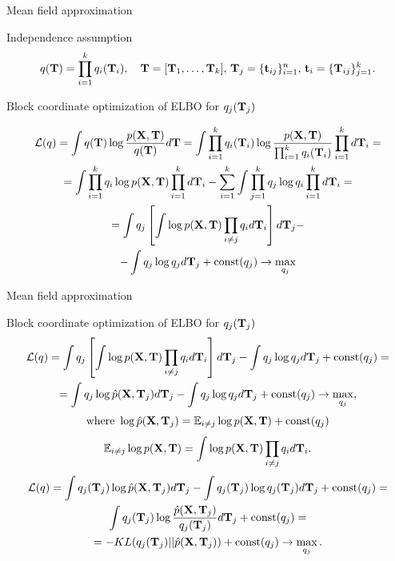 \begin{frame}{Mean field approximation}
    \begin{block}{Independence assumption}
    \vspace{-0.3cm}
    \[
    q(\mathbf{T}) = \prod_{i=1}^k q_i(\mathbf{T}_i), \quad \mathbf{T} = [\mathbf{T}_1, \dots, \mathbf{T}_k], \, \mathbf{T}_j = \{ \mathbf{t}_{ij}\}_{i=1}^n, \, \mathbf{t}_i = \{ \mathbf{T}_{ij}\}_{j=1}^k.
    \]
    \vspace{-0.3cm}
    \end{block}
    \begin{block}{Block coordinate optimization of ELBO for $q_j(\mathbf{T}_j)$}
  
    {\footnotesize
    \vspace{-0.3cm}
        \begin{multline*}
    		\mathcal{L} (q)
    		= \int q(\mathbf{T}) \log \frac{p(\mathbf{X}, \mathbf{T})}{q(\mathbf{T})}d\mathbf{T}
    		= \int \prod_{i=1}^k q_i(\mathbf{T}_i) \log \frac{p(\mathbf{X}, \mathbf{T})}{\prod_{i=1}^k q_i(\mathbf{T}_i)}  \prod_{i=1}^k d \mathbf{T}_i = \\
    		= \int \prod_{i=1}^k q_i \log p(\mathbf{X}, \mathbf{T}) \prod_{i=1}^k d \mathbf{T}_i  
    		- \sum_{i=1}^k \int \prod_{j=1}^k q_j \log q_i \prod_{i=1}^k d \mathbf{T}_i = \\
    		= \int q_j \left[\int  \log p(\mathbf{X}, \mathbf{T}) \prod_{i \neq j} q_i d \mathbf{T}_i \right] d \mathbf{T}_j - \\
    		- \int q_j \log q_j d\mathbf{T}_j + \text{const}(q_j) \rightarrow \max_{q_j}
    	\end{multline*}
        \vspace{-0.3cm}}
    \end{block}
\end{frame}
\begin{frame}{Mean field approximation}
	\footnotesize
	\begin{block}{Block coordinate optimization of ELBO for $q_j(\mathbf{T}_j)$}
		\vspace{-0.4cm}
	    \begin{multline*}
			\mathcal{L} (q) 
			= \int q_j \left[\int \log p(\mathbf{X}, \mathbf{T}) \prod_{i \neq j} q_i d \mathbf{T}_i \right] d \mathbf{T}_j
			- \int q_j \log q_j  d\mathbf{T}_j + \text{const}(q_j) = \\
			= \int q_j \log \hat{p}(\mathbf{X}, \mathbf{T}_j) d \mathbf{T}_j 
			- \int q_j \log q_j d\mathbf{T}_j + \text{const}(q_j) \rightarrow \max_{q_j},
		\end{multline*}
		\[
		    \text{where } \log \hat{p}(\mathbf{X}, \mathbf{T}_j) = \mathbb{E}_{i \neq j} \log p(\mathbf{X}, \mathbf{T}) + \text{const}(q_j)
		\]
		\[
		    \mathbb{E}_{i \neq j} \log p(\mathbf{X}, \mathbf{T}) = \int \log p(\mathbf{X}, \mathbf{T}) \prod_{i \neq j} q_i d \mathbf{T}_i.
		\]
		\vspace{-0.1cm}
		\begin{multline*}
    		\mathcal{L} (q)
    		= \int q_j (\mathbf{T}_j) \log \hat{p}(\mathbf{X}, \mathbf{T}_j) d \mathbf{T}_j - \int q_j(\mathbf{T}_j) \log q_j(\mathbf{T}_j) d\mathbf{T}_j + \text{const}(q_j) = \\
    		 \int q_j (\mathbf{T}_j) \log \frac{\hat{p}(\mathbf{X}, \mathbf{T}_j)}{q_j(\mathbf{T}_j)} d\mathbf{T}_j + \text{const}(q_j) = \\
    		= - KL (q_j(\mathbf{T}_j) || \hat{p}(\mathbf{X}, \mathbf{T}_j)) + \text{const}(q_j) \rightarrow \max_{q_j}.
    	\end{multline*}
    \end{block}
\end{frame}
